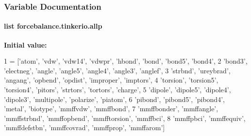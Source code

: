 \subsubsection{Variable Documentation}
\hypertarget{namespaceforcebalance_1_1tinkerio_a75034d69fb74625cf2fb284fb01b35ec}{
\paragraph[{allp}]{\setlength{\rightskip}{0pt plus 5cm}list forcebalance.\-tinkerio.\-allp}}\label{namespaceforcebalance_1_1tinkerio_a75034d69fb74625cf2fb284fb01b35ec}
{\bfseries Initial value\-:}
\begin{DoxyCode}
1 = [\textcolor{stringliteral}{'atom'}, \textcolor{stringliteral}{'vdw'}, \textcolor{stringliteral}{'vdw14'}, \textcolor{stringliteral}{'vdwpr'}, \textcolor{stringliteral}{'hbond'}, \textcolor{stringliteral}{'bond'}, \textcolor{stringliteral}{'bond5'}, \textcolor{stringliteral}{'bond4'},
2         \textcolor{stringliteral}{'bond3'}, \textcolor{stringliteral}{'electneg'}, \textcolor{stringliteral}{'angle'}, \textcolor{stringliteral}{'angle5'}, \textcolor{stringliteral}{'angle4'}, \textcolor{stringliteral}{'angle3'}, \textcolor{stringliteral}{'anglef'},
3         \textcolor{stringliteral}{'strbnd'}, \textcolor{stringliteral}{'ureybrad'}, \textcolor{stringliteral}{'angang'}, \textcolor{stringliteral}{'opbend'}, \textcolor{stringliteral}{'opdist'}, \textcolor{stringliteral}{'improper'}, \textcolor{stringliteral}{'imptors'},
4         \textcolor{stringliteral}{'torsion'}, \textcolor{stringliteral}{'torsion5'}, \textcolor{stringliteral}{'torsion4'}, \textcolor{stringliteral}{'pitors'}, \textcolor{stringliteral}{'strtors'}, \textcolor{stringliteral}{'tortors'}, \textcolor{stringliteral}{'charge'},
5         \textcolor{stringliteral}{'dipole'}, \textcolor{stringliteral}{'dipole5'}, \textcolor{stringliteral}{'dipole4'}, \textcolor{stringliteral}{'dipole3'}, \textcolor{stringliteral}{'multipole'}, \textcolor{stringliteral}{'polarize'}, \textcolor{stringliteral}{'piatom'},
6         \textcolor{stringliteral}{'pibond'}, \textcolor{stringliteral}{'pibond5'}, \textcolor{stringliteral}{'pibond4'}, \textcolor{stringliteral}{'metal'}, \textcolor{stringliteral}{'biotype'}, \textcolor{stringliteral}{'mmffvdw'}, \textcolor{stringliteral}{'mmffbond'},
7         \textcolor{stringliteral}{'mmffbonder'}, \textcolor{stringliteral}{'mmffangle'}, \textcolor{stringliteral}{'mmffstrbnd'}, \textcolor{stringliteral}{'mmffopbend'}, \textcolor{stringliteral}{'mmfftorsion'}, \textcolor{stringliteral}{'mmffbci'},
8         \textcolor{stringliteral}{'mmffpbci'}, \textcolor{stringliteral}{'mmffequiv'}, \textcolor{stringliteral}{'mmffdefstbn'}, \textcolor{stringliteral}{'mmffcovrad'}, \textcolor{stringliteral}{'mmffprop'}, \textcolor{stringliteral}{'mmffarom'}]
\end{DoxyCode}


